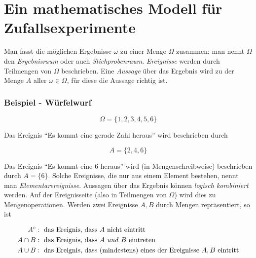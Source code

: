 



\part{Ein mathematisches Modell für Zufallsexperimente}

Man fasst die möglichen Ergebnisse $\omega$ zu einer Menge $\Omega$ zusammen; man nennt $\Omega$ den \textit{Ergebnisraum} oder auch \textit{Stichprobenraum}. \textit{Ereignisse} werden durch Teilmengen von $\Omega$ beschrieben.
Eine \textit{Aussage} über das Ergebnis wird zu der Menge $A$ aller $\omega \in \Omega$, für diese die Aussage richtig ist.

\section{Beispiel - Würfelwurf}

\begin{displaymath}
\Omega = \{1,2,3,4,5,6\}
\end{displaymath}

Das Ereignis ``Es kommt eine gerade Zahl heraus'' wird beschrieben durch

\begin{displaymath}
A = \{2,4,6\}
\end{displaymath}

Das Ereignis ``Es kommt eine 6 heraus'' wird (in Mengenschreibweise) beschrieben durch $A = \{6\}$.
Solche Ereignisse, die nur aus einem Element bestehen, nennt man \textit{Elementarereignisse}.
Aussagen über das Ergebnis können \textit{logisch kombiniert} werden. Auf der Ereignisseite (also in Teilmengen von $\Omega$) wird dies zu Mengenoperationen. Werden zwei Ereignisse $A, B$ durch Mengen repräsentiert, so ist

\begin{align*}
A^c &:\text{ das Ereignis, dass $A$ nicht eintritt}\\
A \cap B &: \text{ das Ereignis, dass $A$ \textit{und} $B$ eintreten}\\
A \cup B &: \text{ das Ereignis, dass (mindestens) eines der Ereignisse $A,B$ eintritt}
\end{align*}

